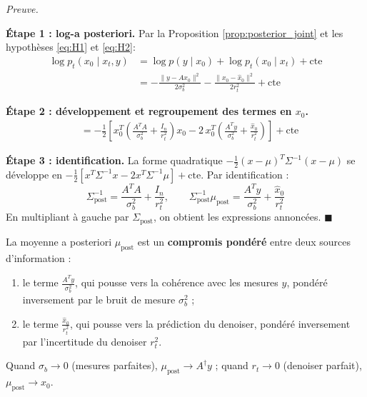\documentclass[12pt]{article}
\renewcommand{\qedsymbol}{$\blacksquare$}
\renewenvironment{proof}[1][\proofname]{%
  \par\medskip\noindent
  \textit{\color{proofgray}#1.}\enspace\ignorespaces
}{\hfill\qedsymbol\par\medskip}
\renewcommand{\proofname}{Preuve}
\begin{document}
 \begin{proof}



\textbf{Étape 1 : log-a posteriori.} Par la Proposition \ref{prop:posterior_joint} et les hypothèses \ref{eq:H1} et \ref{eq:H2}:
\begin{align}
    \log p_t(x_0 \mid x_t, y) &= \log p(y \mid x_0) + \log p_t(x_0 \mid x_t) + \text{cte} \nonumber\\
    &= -\frac{\|y - Ax_0\|^2}{2\sigma_b^2} - \frac{\|x_0 - \hat{x}_0\|^2}{2r_t^2} + \text{cte} \label{eq:log_post}
\end{align}

\textbf{Étape 2 : développement et regroupement des termes en $x_0$.}
\begin{align}
    &= -\frac{1}{2}\left[x_0^T\!\left(\frac{A^T A}{\sigma_b^2} + \frac{I_n}{r_t^2}\right)\!x_0 - 2\, x_0^T\!\left(\frac{A^T y}{\sigma_b^2} + \frac{\hat{x}_0}{r_t^2}\right)\right] + \text{cte}
\end{align}

\textbf{Étape 3 : identification.} La forme quadratique $-\frac{1}{2}(x - \mu)^T \Sigma^{-1}(x - \mu)$ se développe en $-\frac{1}{2}[x^T \Sigma^{-1} x - 2x^T \Sigma^{-1}\mu] + \text{cte}$. Par identification :
\[
\Sigma_{\text{post}}^{-1} = \frac{A^T A}{\sigma_b^2} + \frac{I_n}{r_t^2}, \qquad \Sigma_{\text{post}}^{-1} \mu_{\text{post}} = \frac{A^T y}{\sigma_b^2} + \frac{\hat{x}_0}{r_t^2}
\]
En multipliant à gauche par $\Sigma_{\text{post}}$, on obtient les expressions annoncées.
\end{proof}

\begin{remarkbox}
La moyenne a posteriori $\mu_{\text{post}}$ est un \textbf{compromis pondéré} entre deux sources d'information :
\begin{enumerate}[label=(\roman*)]
    \item le terme $\frac{A^T y}{\sigma_b^2}$, qui pousse vers la cohérence avec les mesures $y$, pondéré inversement par le bruit de mesure $\sigma_b^2$ ;
    \item le terme $\frac{\hat{x}_0}{r_t^2}$, qui pousse vers la prédiction du denoiser, pondéré inversement par l'incertitude du denoiser $r_t^2$.
\end{enumerate}
Quand $\sigma_b \to 0$ (mesures parfaites), $\mu_{\text{post}} \to A^\dagger y$ ; quand $r_t \to 0$ (denoiser parfait), $\mu_{\text{post}} \to \hat{x}_0$.
\end{remarkbox}
\end{document}
